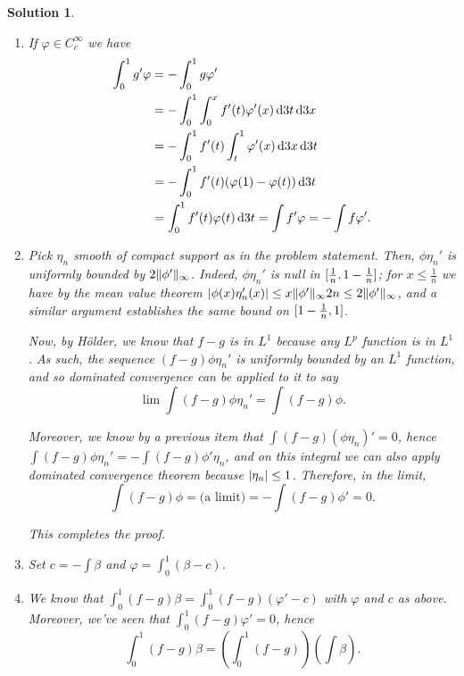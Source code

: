 \documentclass{article}
\theoremstyle{nonumberplain}
\newtheorem{sol}{Solution}
\DeclarePairedDelimiter{\abs}{\lvert}{\rvert}
\DeclarePairedDelimiter{\Norm}{\lVert}{\rVert}
\begin{document}
\begin{sol}
\leavevmode
\begin{enumerate}
\item If $\varphi \in C^\infty_c$ we have
\begin{equation}
\begin{aligned}
\int_0^1 g' \varphi
&= - \int_0^1 g \varphi'\\
&= - \int_0^1 \int_0^x f'(t) \varphi'(x) \dl3 t \dl3 x\\
&= - \int_0^1 f'(t) \int_t^1 \varphi'(x) \dl3 x \dl3 t\\
&= - \int_0^1 f'(t) (\varphi(1) - \varphi(t)) \dl3 t\\
&= \int_0^1 f'(t) \varphi(t) \dl3 t = \int f' \varphi = - \int f \varphi'.
\end{aligned}
\end{equation}
\item Pick $\eta_n$ smooth of compact support as in the problem statement. Then, $\phi \eta_n'$ is uniformly bounded by $2 \Norm{\phi'}_\infty$. Indeed, $\phi \eta_n'$ is null in $\interval{\frac1n}{1-\frac1n}$; for $x \leq \frac1n$ we have by the mean value theorem $\abs{\phi(x) \eta_n'(x)} \leq x \Norm{\phi'}_\infty 2n \leq 2 \Norm{\phi'}_\infty$, and a similar argument establishes the same bound on $\interval{1-\frac1n}1$.

Now, by Hölder, we know that $f-g$ is in $L^1$ because any $L^p$ function is in $L^1$. As such, the sequence $(f-g)\phi\eta_n'$ is uniformly bounded by an $L^1$ function, and so dominated convergence can be applied to it to say
\begin{equation}
\lim \int(f-g)\phi\eta_n' = \int (f-g) \phi.
\end{equation}

Moreover, we know by a previous item that $\int (f-g) (\phi \eta_n)' = 0$, hence $\int (f-g) \phi \eta_n' = - \int (f-g) \phi' \eta_n$, and on this integral we can also apply dominated convergence theorem because $\abs{\eta_n} \leq 1$. Therefore, in the limit,
\begin{equation}
\int (f-g)\phi = \text{(a limit)} = - \int (f-g) \phi' = 0.
\end{equation}

This completes the proof.

\item Set $c = -\int \beta$ and $\varphi = \int_0^1 (\beta - c)$.

\item We know that $\int_0^1 (f-g) \beta = \int_0^1 (f-g) (\varphi' - c)$ with $\varphi$ and $c$ as above. Moreover, we've seen that $\int_0^1 (f-g) \varphi' = 0$, hence
\begin{equation}
\int_0^1 (f-g) \beta = \left( \int_0^1 (f-g) \right) \left( \int \beta \right).
\end{equation}


\end{enumerate}
\end{sol}
\end{document}
